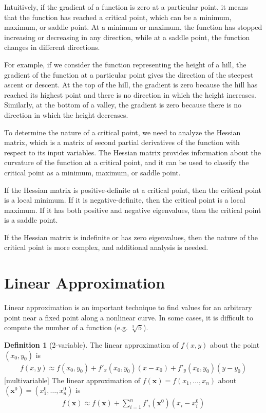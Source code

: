 \documentclass[10pt,a4paper]{book}
\theoremstyle{definition}\newtheorem{definition}{Definition}
\theoremstyle{definition}\newtheorem{fact}{Fact}
\theoremstyle{definition}\newtheorem{ex}{Ex.}
\theoremstyle{definition}\newtheorem{project}{Project}
\theoremstyle{definition}\newtheorem{problem}{Problem}
\theoremstyle{definition}\newtheorem{example}{Example}
\numberwithin{theorem}{chapter}
\numberwithin{corollary}{chapter}
\numberwithin{assumption}{chapter}
\numberwithin{definition}{chapter}
\numberwithin{prop}{chapter}
\numberwithin{notation}{chapter}
\numberwithin{problem}{chapter}
\numberwithin{example}{chapter}
\numberwithin{fact}{chapter}
\numberwithin{ex}{chapter}
\newenvironment{fdefinition}
{\begin{mdframed}\begin{definition}}
		{\end{definition}\end{mdframed}}
\def\x{\mathbf x}
\begin{document}
	Intuitively, if the gradient of a function is zero at a particular point, it means that the function has reached a critical point, which can be a minimum, maximum, or saddle point. At a minimum or maximum, the function has stopped increasing or decreasing in any direction, while at a saddle point, the function changes in different directions.
	
	For example, if we consider the function representing the height of a hill, the gradient of the function at a particular point gives the direction of the steepest ascent or descent. At the top of the hill, the gradient is zero because the hill has reached its highest point and there is no direction in which the height increases. Similarly, at the bottom of a valley, the gradient is zero because there is no direction in which the height decreases.
	
	To determine the nature of a critical point, we need to analyze the Hessian matrix, which is a matrix of second partial derivatives of the function with respect to its input variables. The Hessian matrix provides information about the curvature of the function at a critical point, and it can be used to classify the critical point as a minimum, maximum, or saddle point.
	
	If the Hessian matrix is positive-definite at a critical point, then the critical point is a local minimum. If it is negative-definite, then the critical point is a local maximum. If it has both positive and negative eigenvalues, then the critical point is a saddle point.
	
	If the Hessian matrix is indefinite or has zero eigenvalues, then the nature of the critical point is more complex, and additional analysis is needed.	
	
	\section{Linear Approximation}
	Linear approximation is an important technique to find values for an arbitrary point near a fixed point along a nonlinear curve. In some cases, it is difficult to compute the number of a function (e.g. $\sqrt[3]{5}$).
	
	\begin{fdefinition}
		[2-variable] The linear approximation of $f(x,y)$ about the point $(x_0, y_0)$ is
		\begin{align*}
			f(x,y) \approx f(x_0,y_0) + f'_x (x_0,y_0) (x - x_0) + f'_y (x_0, y_0) (y-y_0) 
		\end{align*}
		[multivariable] The linear approximation of $f(\x) = f(x_1, \dots, x_n)$ about $(\x^0) = (x^0_1, \dots, x^0_n)$ is 
		\begin{align*}
			f(\x) \approx f(\x) + \sum^n_{i=1} f'_{i} (\x^0) (x_i - x^0_i) 
		\end{align*}
	\end{fdefinition}
	
\end{document}
